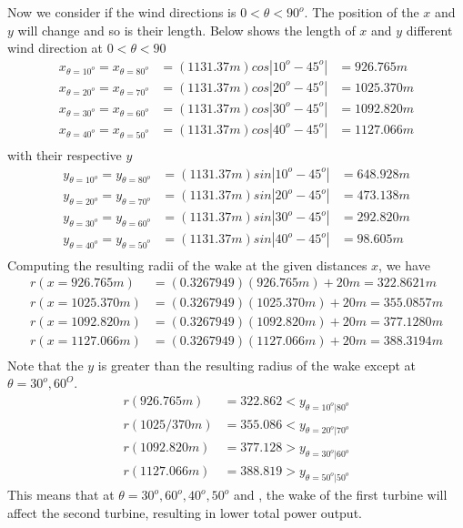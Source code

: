 Now we consider if the wind directions is $0<\theta<90^{o}$. The position of the $x$ and $y$ will change and so is their length. Below shows the length of $x$ and $y$
different wind direction at $0<\theta<90$   
    \begin{align*}
        x_{\theta=10^{o}} = x_{\theta=80^{o}} &= (1131.37m)cos|10^{o}-45^{o}| &= 926.765m \\ 
        x_{\theta=20^{o}} = x_{\theta=70^{o}} &= (1131.37m)cos|20^{o}-45^{o}| &= 1025.370m \\ 
        x_{\theta=30^{o}} = x_{\theta=60^{o}} &= (1131.37m)cos|30^{o}-45^{o}| &= 1092.820m \\ 
        x_{\theta=40^{o}} = x_{\theta=50^{o}} &= (1131.37m)cos|40^{o}-45^{o}| &= 1127.066m \\ 
    \end{align*}
    with their respective $y$
    \begin{align*}
        y_{\theta=10^{o}} = y_{\theta=80^{o}} &= (1131.37m)sin|10^{o}-45^{o}| &= 648.928m \\ 
        y_{\theta=20^{o}} = y_{\theta=70^{o}} &= (1131.37m)sin|20^{o}-45^{o}| &= 473.138m \\ 
        y_{\theta=30^{o}} = y_{\theta=60^{o}} &= (1131.37m)sin|30^{o}-45^{o}| &= 292.820m \\ 
        y_{\theta=40^{o}} = y_{\theta=50^{o}} &= (1131.37m)sin|40^{o}-45^{o}| &= 98.605m \\ 
    \end{align*}
Computing the resulting radii of the wake at the given distances $x$, we have
    \begin{align*}
        r(x=926.765m) &= (0.3267949)(926.765m)+20m=322.8621m \\
        r(x=1025.370m) &= (0.3267949)(1025.370m)+20m=355.0857m \\
        r(x=1092.820m) &= (0.3267949)(1092.820m)+20m=377.1280m \\
        r(x=1127.066m) &= (0.3267949)(1127.066m)+20m=388.3194m \\
    \end{align*}
Note that the $y$ is greater than the resulting radius of the wake except at $\theta=30^{o},60^{O}$.
	\begin{align*}
		r(926.765m) &= 322.862 < y_{\theta=10^{o}|80^{o}} \\
		r(1025/370m) &= 355.086 < y_{\theta=20^{o}|70^{o}} \\
		r(1092.820m) &= 377.128 > y_{\theta=30^{o}|60^{o}} \\
		r(1127.066m) &= 388.819 > y_{\theta=50^{o}|50^{o}} 
	\end{align*}
This means that at $\theta=30^{o},60^{o},40^{o},50^{o} $ and , the wake of the first turbine will affect the second turbine, resulting in lower total power output.



